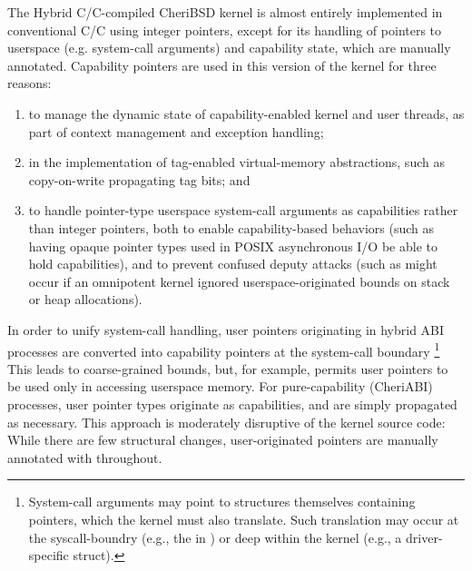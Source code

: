 \documentclass[12pt,twoside,openright,a4paper]{article}
\newcommand{\ccode}[1]{{\small\ttfamily{#1}}}
\newcommand{\uucap}{{\ccode{\_\_capability}}\xspace}
\newcommand{\note}[2]{{\color{blue}[ Note: #1 - #2]}}
\renewcommand{\note}[2]{\relax\ifhmode\unskip\fi}
\newcommand{\jhbnote}[1]{\note{#1}{John B.}}
\newcommand*{\cpp}{\texorpdfstring{C\textsmaller[2]{\protect\nolinebreak[4]\hspace{-.05em}\raisebox{.45ex}{\textbf{++}}}}{C++}}
\newcommand*{\COrCpp}{C/\cpp{}}
\newcommand*{\hybridCOrCpp}{Hybrid \COrCpp{}}
\begin{document}
The \hybridCOrCpp{}-compiled CheriBSD kernel is almost entirely implemented
in conventional \COrCpp{} using integer pointers, except for its handling of
pointers to userspace (e.g.  system-call arguments) and capability state,
which are manually annotated.
Capability pointers are used in this version of the kernel for three reasons:

\begin{enumerate}
\item to manage the dynamic state of capability-enabled kernel and user
  threads, as part of context management and exception handling;

\item in the implementation of tag-enabled virtual-memory abstractions, such
  as copy-on-write propagating tag bits; and

\item to handle pointer-type userspace system-call arguments as capabilities
  rather than integer pointers, both to enable capability-based behaviors
  (such as having opaque pointer types used in POSIX asynchronous I/O be able
  to hold capabilities), and to prevent confused deputy attacks (such as might
  occur if an omnipotent kernel ignored userspace-originated bounds on stack
  or heap allocations).
  \jhbnote{I think system-call argument is perhaps too limiting.  We
    also use capabilities for things like the initial stack layout
    during exec which is fabricated by the kernel and not provided as
    a syscall argument.  I think it might be best to say something
    like ``userspace pointers'' most of which come from
    user-originated system call arguments, but may also be
    instantiated by the kernel.}
\end{enumerate}

In order to unify system-call handling, user pointers originating in hybrid
ABI processes are converted into capability pointers at the system-call
boundary%
\footnote{System-call arguments may point to structures themselves containing
  pointers, which the kernel must also translate.
  Such translation may occur at the syscall-boundry (e.g., the \ccode{struct
  iovec} in \ccode{readv}) or deep within the kernel (e.g., a driver-specific
  \ccode{ioctl} struct).}
%
This leads to coarse-grained bounds, but, for example, permits user pointers to
be used only in accessing userspace memory.
For pure-capability (CheriABI) processes, user pointer types originate as
capabilities, and are simply propagated as necessary.
This approach is moderately disruptive of the kernel source code: While there
are few structural changes, user-originated pointers are manually annotated
with \uucap{} throughout.
\end{document}
